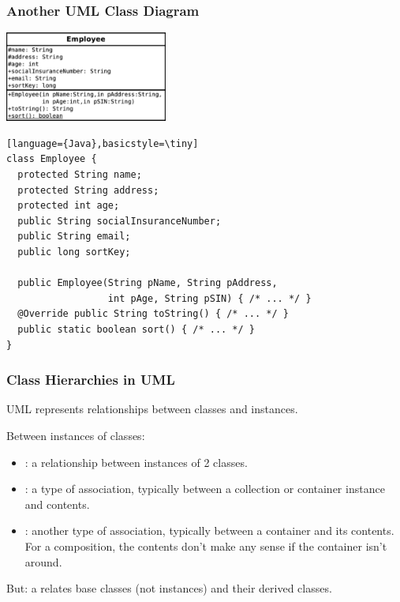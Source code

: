 \begin{frame}[fragile]
\frametitle{Another UML Class Diagram}

\begin{changemargin}{1cm}

\begin{center}
\includegraphics[height=8em]{images/Employee.pdf}
\end{center}

\begin{verbatim}[language={Java},basicstyle=\tiny]
class Employee {
  protected String name;
  protected String address;
  protected int age;
  public String socialInsuranceNumber;
  public String email;
  public long sortKey;

  public Employee(String pName, String pAddress, 
                  int pAge, String pSIN) { /* ... */ }
  @Override public String toString() { /* ... */ }
  public static boolean sort() { /* ... */ }
}
\end{verbatim}
\end{changemargin}
\end{frame}

\begin{frame}
\frametitle{Class Hierarchies in UML}

\begin{changemargin}{1cm}
UML represents relationships
between classes and instances.

Between instances of classes:
\begin{itemize}
\item {}: a relationship between instances
of 2 classes.
\item {}: a type of association, typically between a
collection or container instance and contents.
\item {}: another type of association, typically
between a container and its contents. \\
For a composition, the contents
don't make any sense if the container isn't around.
\end{itemize}

But: a  relates base classes (not
instances) and their derived classes.
\end{changemargin}
\end{frame}

